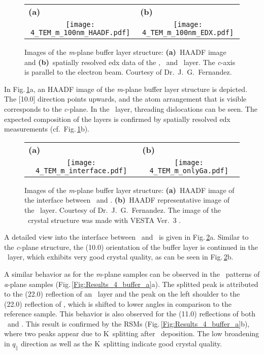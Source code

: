 \begin{figure}[ht]
    \centering
    \begin{tabular}{cc}
    \multicolumn{1}{l}{\textbf{(a)}} & \multicolumn{1}{l}{\textbf{(b)}} \\
        \texttt{[image: 4\_TEM\_m\_100nm\_HAADF.pdf]}
        & \texttt{[image: 4\_TEM\_m\_100nm\_EDX.pdf]}
    \end{tabular}
    \caption{
        Images of the \textit{m}-plane buffer layer structure:
        \textbf{(a)}~\acrshort{HAADF} image and \textbf{(b)}~spatially resolved \acrshort{edx} data of the \alo, \cro\ and \agao\ layer.
        The \textit{c}-axis is parallel to the electron beam.
        Courtesy of Dr.\ J.\ G.\  Fernandez.
    }
    \label{Fig:Results_4_TEM_m_100nm}
\end{figure}
In Fig.\,\ref{Fig:Results_4_TEM_m_100nm}a, an \acrshort{HAADF} image of the \textit{m}-plane buffer layer structure is depicted.
The [10.0] direction points upwards, and the atom arrangement that is visible corresponds to the \textit{c}-plane.
In the \agao\ layer, threading dislocations can be seen.
The expected composition of the layers is confirmed by spatially resolved \acrshort{edx} measurements (cf.\ Fig.\,\ref{Fig:Results_4_TEM_m_100nm}b).
\begin{figure}
    \centering
    \begin{tabular}{cc}
        \multicolumn{1}{l}{\textbf{(a)}} & \multicolumn{1}{l}{\textbf{(b)}} \\
        \texttt{[image: 4\_TEM\_m\_interface.pdf]}
        & \texttt{[image: 4\_TEM\_m\_onlyGa.pdf]}   
    \end{tabular}
    \caption{
        Images of the \textit{m}-plane buffer layer structure:
        \textbf{(a)}~\acrshort{HAADF} image of the interface between \cro\ and \agao.
        \textbf{(b)}~\acrshort{HAADF} representative image of the \agao\ layer.
        Courtesy of Dr.\ J.\ G.\  Fernandez.
        The image of the \agao\ crystal structure was made with VESTA Ver.~3 \cite{momma2011}.
    }
    \label{Fig:Results_4_TEM_m_zoom}
\end{figure}
A detailed view into the interface between \cro\ and \agao\ is given in Fig.\,\ref{Fig:Results_4_TEM_m_zoom}a.
Similar to the \textit{c}-plane structure, the (10.0) orientation of the buffer layer is continued in the \agao\ layer, which exhibits very good crystal quality, as can be seen in Fig.\,\ref{Fig:Results_4_TEM_m_zoom}b.

A similar behavior as for the \textit{m}-plane samples can be observed in the \thetaomega\ patterns of \textit{a}-plane samples (Fig.\,\ref{Fig:Results_4_buffer_a}a).
The splitted peak is attributed to the (22.0) reflection of an \agao\ layer and the peak on the left shoulder to the (22.0) reflection of \cro, which is shifted to lower angles in comparison to the reference sample.
This behavior is also observed for the (11.0) reflections of both \agao\ and \cro.
This result is confirmed by the \glspl{RSM} (Fig.\,\ref{Fig:Results_4_buffer_a}b), where two peaks appear due to K\textalpha\ splitting after \gao\ deposition.
The low broadening in $q_\parallel$ direction as well as the K\textalpha\ splitting indicate good crystal quality.


